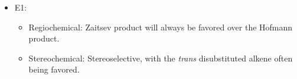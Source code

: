 \documentclass[12pt,a4paper]{article}
\begin{document}
\begin{itemize}
\begin{itemize}
\begin{itemize}
\begin{itemize}
                    \end{itemize}
            \end{itemize}
        \item E1:
            \begin{itemize}
                \item Regiochemical: Zaitsev product will always be favored over the Hofmann product.
                \item Stereochemical: Stereoselective, with the \textit{trans} disubstituted alkene often being favored.
            \end{itemize}
    \end{itemize}
\end{itemize}
\end{document}
